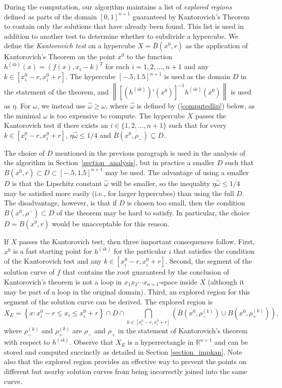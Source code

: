 \documentclass{article}
\newcommand{\norm}[1]{\left\|#1\right\|} \newcommand{\norma}[1]{\left\|#1\right\|}   \newcommand{\inv}[1]{#1^{-1}}
\begin{document}
During the computation, our algorithm maintains a list of
\emph{explored regions} defined as parts of the domain $[0,1]^{n+1}$
guaranteed by Kantorovich's Theorem to contain only
the solutions that have already been found.  This list is used
in addition to another test to determine whether to subdivide a
hypercube.  We define the \emph{Kantorovich test} on a hypercube
$X = \bar{B}(x^0,r)$ as the application of Kantorovich's Theorem
on the point $x^0$ to the function $h^{(ik)}(x) = \left(f(x),x_i-k
\right)^T$ for each $i=1,2,\ldots, n+1$ and any $k \in [x_i^0-r,
x_i^0+r]$.  The hypercube $[-.5,1.5]^{n+1}$ is used as the domain
$D$ in the statement of the theorem, and
$\norm{\left[\left(h^{(ik)}\right)'(x^0)\right]^{-1}h^{(ik)}(x^0)}$
is used as $\eta$. For $\omega$, we instead use $\hat{\omega} \geq
\omega$, where $\hat{\omega}$ is defined by (\ref{computedlip})
below, as the minimal $\omega$ is too expensive to compute. The
hypercube $X$ passes the Kantorovich test if there exists an $i
\in \{1,2, \ldots, n+1 \}$ such that for every $k \in [x_i^0-r, x_i^0+r]$,
$\eta \hat{\omega} \leq 1/4$ and $\bar{B}(x^0,\rho_-) \subseteq
D$.

The choice of $D$ mentioned in the previous paragraph is used in
the analysis of the algorithm in Section~\ref{section_analysis}, but
in practice a smaller $D$ such that $B(x^0,r)\subset D\subset [-.5,1.5]^{n+1}$
may be used.  The advantage of using a smaller $D$ is that the Lipschitz
constant $\hat\omega$ will be smaller, so the 
inequality $\eta\hat\omega\le 1/4$
may be satisfied
more easily (i.e., for larger hypercubes) than using the full $D$.
The disadvantage, however, is that if $D$ is chosen too small,
then
the condition $B(x^0,\rho^-)\subset D$ of the theorem may be hard
to satisfy. In particular, the choice $D=B(x^0,r)$ would be
unacceptable for this reason.

If $X$ passes the Kantorovich test, then three important consequences
follow.  First, $x^0$ is a fast starting point for
$h^{(ik)}$ for the particular $i$ that satisfies the condition of
the Kantorovich test and any $k \in [x_i^0-r, x_i^0+r]$. Second,
the segment of the solution curve of $f$ that contains the root
guaranteed by the conclusion of Kantorovich's theorem is not a loop in $x_1 x_2 \cdots x_{n+1}$-space inside $X$ (although it may be part of a loop in the
original domain).  Third, an explored region for this segment of the
solution curve can be derived. The explored region is
\begin{equation}
\label{explored_region} X_E = \left\{x : x_i^0-r \leq x_i \leq
x_i^0+r\right\} \cap D \cap \bigcap_{k \in [x_i^0-r, x_i^0+r]}
\left( \bar{B}(x^0,\rho_-^{(k)}) \cup B(x^0,\rho_+^{(k)}) \right),
\end{equation}
where $\rho_-^{(k)}$ and $\rho_+^{(k)}$ are $\rho_-$ and $\rho_+$
in the statement of Kantorovich's theorem with respect to
$h^{(ik)}$.  Observe that $X_E$ is a hyperrectangle in
$\mathbb{R}^{n+1}$ and can be stored and computed succinctly as
detailed in Section \ref{section_impkan}.  Note also that the
explored region provides an effective way to prevent the points on
different but nearby solution curves from being incorrectly
joined into the same curve.
\end{document}
